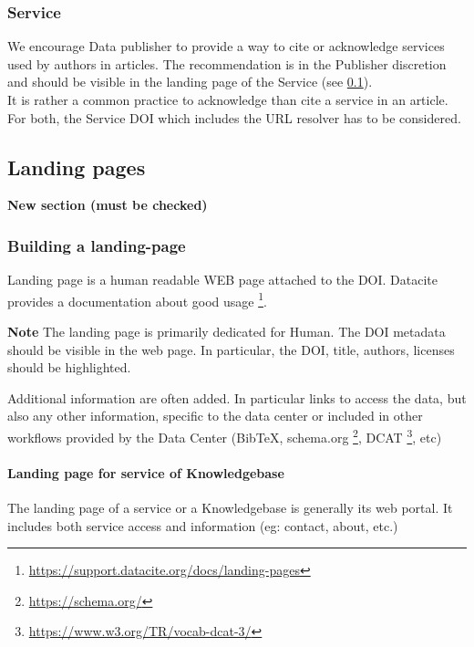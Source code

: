 \documentclass[11pt,a4paper]{ivoa}
\newcommand{\important}[1]{
	\begin{bigdescription}
		\item \color{ivoacolor}\textbf{Note} #1
	\end{bigdescription}
}
\begin{document}
\subsubsection{Service}
We encourage Data publisher to provide a way to cite or acknowledge services used by authors in articles. The recommendation is in the Publisher discretion and should be visible in the landing page of the Service (see \ref{sec:landingpage}).\\

It is rather a common practice to acknowledge than cite a service in an article. For both, the Service DOI which includes the URL resolver has to be considered.

\subsection{Landing pages}
\label{sec:landingpage}
\textbf{\color{red}New section (must be checked)}

\subsubsection{Building a landing-page}
Landing page is a human readable WEB page attached to the DOI. Datacite provides a documentation about good usage \footnote{\url{https://support.datacite.org/docs/landing-pages}}.

\important{
	The landing page is primarily dedicated for Human. 
	The DOI metadata should be visible in the web page. In particular, 
	the DOI, title, authors, licenses should be highlighted.
}



Additional information are often added. In particular links to access the data, but also any other information, specific to the data center or included in other workflows provided by the Data Center (BibTeX, schema.org \footnote{\url{https://schema.org/}}, DCAT \footnote{\url{https://www.w3.org/TR/vocab-dcat-3/}}, etc)


\paragraph{Landing page for service of Knowledgebase}
The landing page of a service or a Knowledgebase is generally its web portal. It includes both service access and information (eg: contact, about, etc.)
\end{document}
